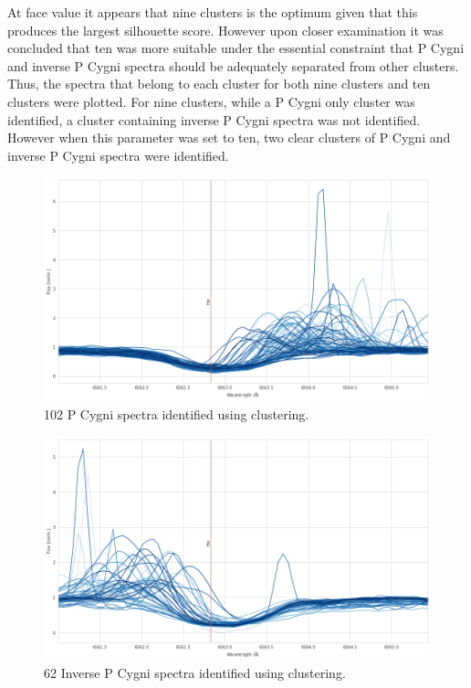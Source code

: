 At face value it appears that nine clusters is the optimum given that this produces the largest silhouette score. However upon closer examination it was concluded that ten was more suitable under the essential constraint that P Cygni and inverse P Cygni spectra should be adequately separated from other clusters. Thus, the spectra that belong to each cluster for both nine clusters and ten clusters were plotted. For nine clusters, while a P Cygni only cluster was identified, a cluster containing inverse P Cygni spectra was not identified. However when this parameter was set to ten, two clear clusters of P Cygni and inverse P Cygni spectra were identified.

\begin{figure}[!htb]
\centering
\includegraphics[scale=0.45]{figures/pcygni.png}
\caption{102 P Cygni spectra identified using clustering.}
\end{figure}

\begin{figure}[!htb]
\centering
\includegraphics[scale=0.45]{figures/inverse p cygni.png}
\caption{62 Inverse P Cygni spectra identified using clustering.}
\label{fig4.6}
\end{figure}

